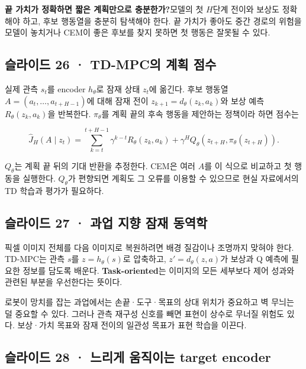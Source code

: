 \documentclass[11pt,a4paper]{article}
\begin{document}
\par\medskip\noindent\textbf{끝 가치가 정확하면 짧은 계획만으로 충분한가?}\quad 모델의 첫 $H$단계 전이와 보상도 정확해야 하고, 후보 행동열을 충분히 탐색해야 한다. 끝 가치가 좋아도 중간 경로의 위험을 모델이 놓치거나 CEM이 좋은 후보를 찾지 못하면 첫 행동은 잘못될 수 있다.\par

\subsection{슬라이드 26 · TD-MPC의 계획 점수}

실제 관측 $s_t$를 encoder $h_\theta$로 잠재 상태 $z_t$에 옮긴다. 후보 행동열 $A=(a_t,\ldots,a_{t+H-1})$에 대해 잠재 전이 $z_{k+1}=d_\theta(z_k,a_k)$와 보상 예측 $R_\theta(z_k,a_k)$을 반복한다. $\pi_\theta$를 계획 끝의 후속 행동을 제안하는 정책이라 하면 점수는\par

\[
\widehat J_H(A\mid z_t)=
\sum_{k=t}^{t+H-1}\gamma^{k-t}R_\theta(z_k,a_k)
+\gamma^H Q_\theta(z_{t+H},\pi_\theta(z_{t+H})).
\]

$Q_\theta$는 계획 끝 뒤의 기대 반환을 추정한다. CEM은 여러 $A$를 이 식으로 비교하고 첫 행동을 실행한다. $Q_\theta$가 편향되면 계획도 그 오류를 이용할 수 있으므로 현실 자료에서의 TD 학습과 평가가 필요하다.\par

\subsection{슬라이드 27 · 과업 지향 잠재 동역학}

픽셀 이미지 전체를 다음 이미지로 복원하려면 배경 질감이나 조명까지 맞혀야 한다. TD-MPC는 관측 $s$를 $z=h_\theta(s)$로 압축하고, $z'=d_\theta(z,a)$가 보상과 Q 예측에 필요한 정보를 담도록 배운다. \textbf{Task-oriented}는 이미지의 모든 세부보다 제어 성과와 관련된 부분을 우선한다는 뜻이다.\par

로봇이 망치를 잡는 과업에서는 손끝·도구·목표의 상대 위치가 중요하고 벽 무늬는 덜 중요할 수 있다. 그러나 관측 재구성 신호를 빼면 표현이 상수로 무너질 위험도 있다. 보상·가치 목표와 잠재 전이의 일관성 목표가 표현 학습을 이끈다.\par

\subsection{슬라이드 28 · 느리게 움직이는 target encoder}
\end{document}
